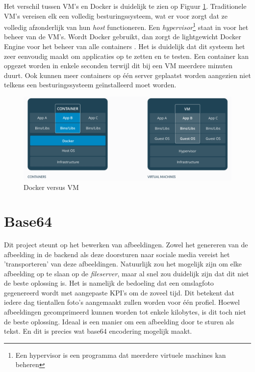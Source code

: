 Het verschil tussen VM's en Docker is duidelijk te zien op Figuur \ref{fig:DockerDiagram}. Traditionele VM's vereisen elk een volledig besturingssysteem, wat er voor zorgt dat ze volledig afzonderlijk van hun \textit{host} functioneren. Een \textit{hypervisor}\footnote{Een hypervisor is een programma dat meerdere virtuele machines kan beheren} staat in voor het beheer van de VM's. Wordt Docker gebruikt, dan zorgt de lightgewicht Docker Engine voor het beheer van alle containers \cite{OpenSourceWhatDocker}. Het is duidelijk dat dit systeem het zeer eenvoudig maakt om applicaties op te zetten en te testen. Een container kan opgezet worden in enkele seconden terwijl dit bij een VM meerdere minuten duurt. Ook kunnen meer containers op \'{e}\'{e}n server geplaatst worden aangezien niet telkens een besturingssysteem ge\"{i}nstalleerd moet worden. 

\begin{figure}[H]
	\centering
	\includegraphics[width=1\textwidth]{Figuren/DockerDiagram.png}
	\caption{Docker versus VM \cite{DockerDiagram}}
	\label{fig:DockerDiagram}
\end{figure}

\newpage
\section{Base64}
Dit project steunt op het bewerken van afbeeldingen. Zowel het genereren van de afbeelding in de backend als deze doorsturen naar sociale media vereist het 'transporteren' van deze afbeeldingen. Natuurlijk zou het mogelijk zijn om elke afbeelding op te slaan op de \textit{fileserver}, maar al snel zou duidelijk zijn dat dit niet de beste oplossing is. Het is namelijk de bedoeling dat een omslagfoto gegenereerd wordt met aangepaste KPI's om de zoveel tijd. Dit betekent dat iedere dag tientallen foto's aangemaakt zullen worden voor \'{e}\'{e}n profiel. Hoewel afbeeldingen gecomprimeerd kunnen worden tot enkele kilobytes, is dit toch niet de beste oplossing. Ideaal is een manier om een afbeelding door te sturen als tekst. En dit is precies wat base64 encodering mogelijk maakt. 

